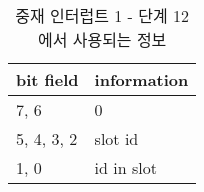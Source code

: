 %
%
\begin{table}[htbp]
\caption{중재 인터럽트 1 - 단계 12에서 사용되는 정보}\label{table:arb-int-p12}
   \begin{center}
   \begin{tabular}{|l|l|} \hline
	bit field & information \\
\hline \hline
	7, 6 & 0 \\
	5, 4, 3, 2 & slot id \\
	1, 0 & id in slot \\
\hline
   \end{tabular}
   \end{center}
\end{table}
%
%
